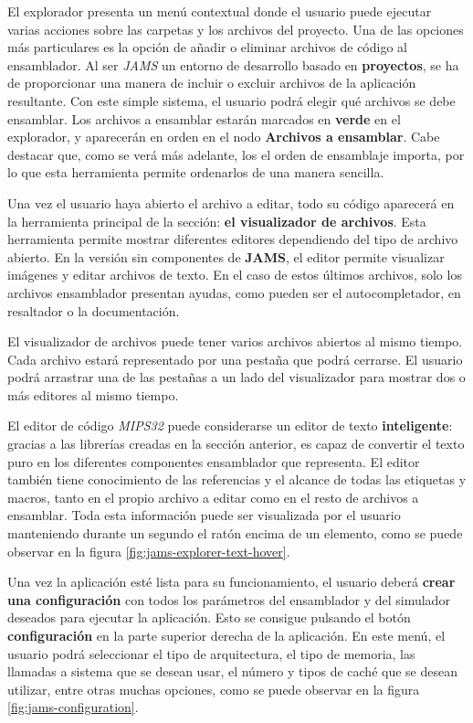 El explorador presenta un menú contextual donde el usuario
puede ejecutar varias acciones sobre las carpetas y los archivos
del proyecto.
Una de las opciones más particulares es la opción de añadir o eliminar
archivos de código al ensamblador.
Al ser \textit{JAMS} un entorno de desarrollo basado en \textbf{proyectos},
se ha de proporcionar una manera de incluir o excluir archivos de
la aplicación resultante.
Con este simple sistema, el usuario podrá elegir qué archivos se debe ensamblar.
Los archivos a ensamblar estarán marcados en \textbf{verde} en el explorador,
y aparecerán en orden en el nodo \textbf{Archivos a ensamblar}.
Cabe destacar que, como se verá más adelante, los el orden de ensamblaje
importa, por lo que esta herramienta permite ordenarlos de una manera sencilla.

Una vez el usuario haya abierto el archivo a editar, todo su código
aparecerá en la herramienta principal de la sección: \textbf{el visualizador
de archivos}.
Esta herramienta permite mostrar diferentes editores dependiendo del tipo
de archivo abierto.
En la versión sin componentes de \textbf{JAMS}, el editor permite visualizar
imágenes y editar archivos de texto.
En el caso de estos últimos archivos, solo los archivos ensamblador presentan
ayudas, como pueden ser el autocompletador, en resaltador o la documentación.

El visualizador de archivos puede tener varios archivos abiertos
al mismo tiempo.
Cada archivo estará representado por una pestaña que podrá cerrarse.
El usuario podrá arrastrar una de las pestañas a un lado del visualizador
para mostrar dos o más editores al mismo tiempo.

El editor de código \textit{MIPS32} puede considerarse un editor
de texto \textbf{inteligente}: gracias a las librerías creadas en la sección
anterior, es capaz de convertir el texto puro en los diferentes componentes
ensamblador que representa.
El editor también tiene conocimiento de las referencias y el alcance de
todas las etiquetas y macros, tanto en el propio archivo a editar
como en el resto de archivos a ensamblar.
Toda esta información puede ser visualizada por el usuario manteniendo
durante un segundo el ratón encima de un elemento, como se puede observar
en la figura \ref{fig:jams-explorer-text-hover}.

Una vez la aplicación esté lista para su funcionamiento,
el usuario deberá \textbf{crear una configuración} con todos los parámetros
del ensamblador y del simulador deseados para ejecutar la aplicación.
Esto se consigue pulsando el botón \textbf{configuración} en la parte
superior derecha de la aplicación.
En este menú, el usuario podrá seleccionar el tipo de arquitectura,
el tipo de memoria, las llamadas a sistema que se desean usar,
el número y tipos de caché que se desean utilizar, entre otras
muchas opciones, como se puede observar en la figura \ref{fig:jams-configuration}.

